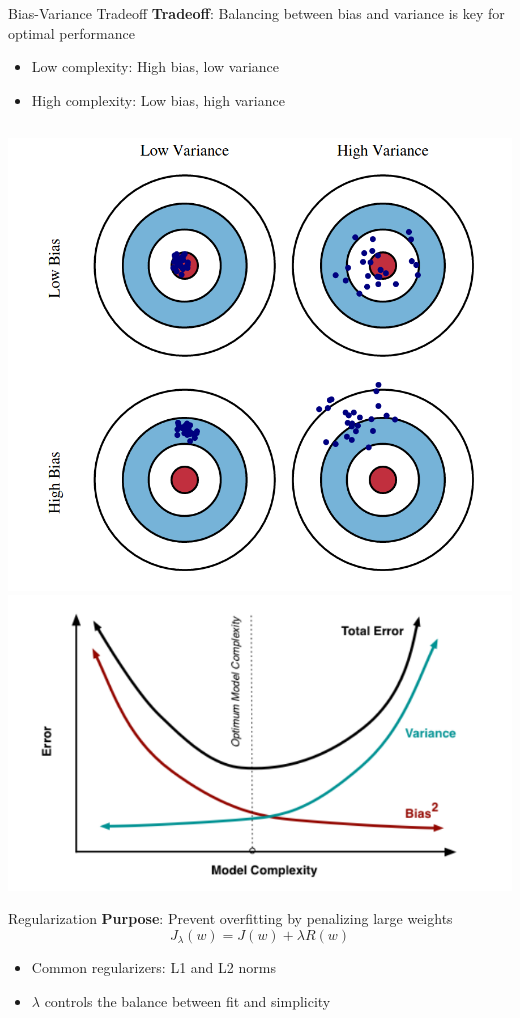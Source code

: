 \documentclass[serif, aspectratio=169]{beamer}
\begin{document}
    \begin{frame}{Bias-Variance Tradeoff}
        \textbf{Tradeoff}: Balancing between bias and variance is key for optimal performance
        \begin{itemize}
            \item Low complexity: High bias, low variance
            \item High complexity: Low bias, high variance
        \end{itemize}
        \[
        \]
        \begin{center}
            \includegraphics[width=0.35\linewidth]{pic/bias-variance.png}
            \hspace{0.25cm}
            \includegraphics[width=0.5\linewidth]{pic/bias-variance2.png}
        \end{center}

    \end{frame}



    \begin{frame}{Regularization}
        \textbf{Purpose}: Prevent overfitting by penalizing large weights
        \[
            J_{\lambda}(w) = J(w) + \lambda R(w)
        \]
        \begin{itemize}
            \item Common regularizers: L1 and L2 norms
            \item \( \lambda \) controls the balance between fit and simplicity
        \end{itemize}
    \end{frame}
\end{document}
